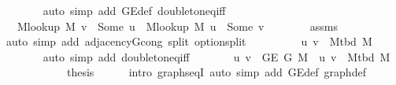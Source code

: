 \begin{isabellebody}
\ \ \ \ \ \ \isamarkupfalse%
\ {\isacharparenleft}{\kern0pt}auto\ simp\ add{\isacharcolon}{\kern0pt}\ G{\isachardot}{\kern0pt}E{\isacharunderscore}{\kern0pt}def\ doubleton{\isacharunderscore}{\kern0pt}eq{\isacharunderscore}{\kern0pt}iff{\isacharparenright}{\kern0pt}\isanewline
\ \ \ \ \isamarkupfalse%
\ \isamarkupfalse%
\ {\isachardoublequoteopen}{\isachardot}{\kern0pt}{\isachardot}{\kern0pt}{\isachardot}{\kern0pt}\ {\isasymlongleftrightarrow}\ M{\isacharunderscore}{\kern0pt}lookup\ M\ v\ {\isacharequal}{\kern0pt}\ Some\ u\ {\isasymor}\ M{\isacharunderscore}{\kern0pt}lookup\ M\ u\ {\isacharequal}{\kern0pt}\ Some\ v{\isachardoublequoteclose}\isanewline
\ \ \ \ \ \ \isamarkupfalse%
\ assms\isanewline
\ \ \ \ \ \ \isamarkupfalse%
\ {\isacharparenleft}{\kern0pt}auto\ simp\ add{\isacharcolon}{\kern0pt}\ adjacency{\isacharunderscore}{\kern0pt}G{}{\isacharunderscore}{\kern0pt}{}{\isacharunderscore}{\kern0pt}cong\ split{\isacharcolon}{\kern0pt}\ option{\isachardot}{\kern0pt}split{\isacharparenright}{\kern0pt}\isanewline
\ \ \ \ \isamarkupfalse%
\ \isamarkupfalse%
\ {\isachardoublequoteopen}{\isachardot}{\kern0pt}{\isachardot}{\kern0pt}{\isachardot}{\kern0pt}\ {\isasymlongleftrightarrow}\ {\isacharbraceleft}{\kern0pt}u{\isacharcomma}{\kern0pt}\ v{\isacharbraceright}{\kern0pt}\ {\isasymin}\ M{\isacharunderscore}{\kern0pt}tbd\ M{\isachardoublequoteclose}\isanewline
\ \ \ \ \ \ \isamarkupfalse%
\ {\isacharparenleft}{\kern0pt}auto\ simp\ add{\isacharcolon}{\kern0pt}\ doubleton{\isacharunderscore}{\kern0pt}eq{\isacharunderscore}{\kern0pt}iff{\isacharparenright}{\kern0pt}\isanewline
\ \ \ \ \isamarkupfalse%
\ \isamarkupfalse%
\ {\isachardoublequoteopen}{\isacharbraceleft}{\kern0pt}u{\isacharcomma}{\kern0pt}\ v{\isacharbraceright}{\kern0pt}\ {\isasymin}\ G{\isachardot}{\kern0pt}E\ {\isacharparenleft}{\kern0pt}G{}{\isacharunderscore}{\kern0pt}{}\ M{\isacharparenright}{\kern0pt}\ {\isasymlongleftrightarrow}\ {\isacharbraceleft}{\kern0pt}u{\isacharcomma}{\kern0pt}\ v{\isacharbraceright}{\kern0pt}\ {\isasymin}\ M{\isacharunderscore}{\kern0pt}tbd\ M{\isachardoublequoteclose}\isanewline
\ \ \ \ \ \ \isacommand{{\isachardot}{\kern0pt}}\isamarkupfalse%
\ \isacommand{{\isacharbraceright}{\kern0pt}}\isamarkupfalse%
\isanewline
\ \ \isamarkupfalse%
\ {\isacharquery}{\kern0pt}thesis\isanewline
\ \ \ \ \isamarkupfalse%
\ {\isacharparenleft}{\kern0pt}intro\ graphs{\isacharunderscore}{\kern0pt}eqI{\isacharparenright}{\kern0pt}\ {\isacharparenleft}{\kern0pt}auto\ simp\ add{\isacharcolon}{\kern0pt}\ G{\isachardot}{\kern0pt}E{\isacharunderscore}{\kern0pt}def\ graph{\isacharunderscore}{\kern0pt}def{\isacharparenright}{\kern0pt}\isanewline

\end{isabellebody}
